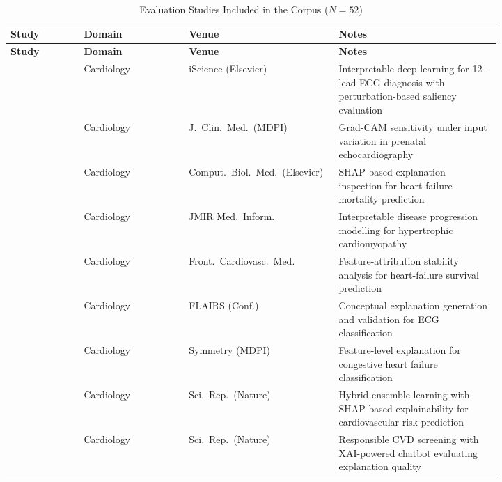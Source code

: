 \begin{longtable}{|>{\raggedright\arraybackslash}p{0.14\linewidth}|>{\raggedright\arraybackslash}p{0.20\linewidth}|>{\raggedright\arraybackslash}p{0.17\linewidth}|>{\raggedright\arraybackslash}p{0.31\linewidth}|}
\caption{Evaluation Studies Included in the Corpus ($N = 52$)}
\label{tab:dataset_papers}\\
\hline
\textbf{Study} & \textbf{Domain} & \textbf{Venue} & \textbf{Notes} \\
\hline
\endfirsthead
\hline
\textbf{Study} & \textbf{Domain} & \textbf{Venue} & \textbf{Notes} \\
\hline
\endhead

\cite{Zhang2021} & Cardiology & iScience (Elsevier) & Interpretable deep learning for 12-lead ECG diagnosis with perturbation-based saliency evaluation \\
\hline
\cite{Nurmaini2022} & Cardiology & J.\ Clin.\ Med.\ (MDPI) & Grad-CAM sensitivity under input variation in prenatal echocardiography \\
\hline
\cite{Vazquez2021} & Cardiology & Comput.\ Biol.\ Med.\ (Elsevier) & SHAP-based explanation inspection for heart-failure mortality prediction \\
\hline
\cite{Piculin2022} & Cardiology & JMIR Med.\ Inform. & Interpretable disease progression modelling for hypertrophic cardiomyopathy \\
\hline
\cite{MorenoSanchez2023} & Cardiology & Front.\ Cardiovasc.\ Med. & Feature-attribution stability analysis for heart-failure survival prediction \\
\hline
\cite{Sangroya2022} & Cardiology & FLAIRS (Conf.) & Conceptual explanation generation and validation for ECG classification \\
\hline
\cite{Li2020} & Cardiology & Symmetry (MDPI) & Feature-level explanation for congestive heart failure classification \\
\hline
\cite{shah2025explainable} & Cardiology & Sci.\ Rep.\ (Nature) & Hybrid ensemble learning with SHAP-based explainability for cardiovascular risk prediction \\
\hline
\cite{muneer2025blockchain} & Cardiology & Sci.\ Rep.\ (Nature) & Responsible CVD screening with XAI-powered chatbot evaluating explanation quality \\
\hline


\end{longtable}
